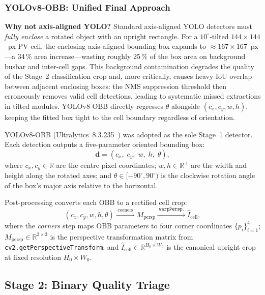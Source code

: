 \documentclass[conference]{IEEEtran}
\begin{document}
\subsubsection{YOLOv8-OBB: Unified Final Approach}
\label{sec:yolo}

\textbf{Why not axis-aligned YOLO?} Standard axis-aligned YOLO detectors must \textit{fully enclose} a rotated object with an upright rectangle. For a $10^\circ$-tilted $144\times144$~px PV cell, the enclosing axis-aligned bounding box expands to $\approx$$\!167\times167$~px---a 34\,\% area increase---wasting roughly 25\,\% of the box area on background busbar and inter-cell gaps. This background contamination degrades the quality of the Stage~2 classification crop and, more critically, causes heavy IoU overlap between adjacent enclosing boxes: the NMS suppression threshold then erroneously removes valid cell detections, leading to systematic missed extractions in tilted modules. YOLOv8-OBB directly regresses $\theta$ alongside $(c_x, c_y, w, h)$, keeping the fitted box tight to the cell boundary regardless of orientation.

YOLOv8-OBB (Ultralytics~8.3.235~\cite{jocher2023}) was adopted as the sole Stage~1 detector. Each detection outputs a five-parameter oriented bounding box:
\begin{equation}
  \mathbf{d} = (c_x,\; c_y,\; w,\; h,\; \theta),
  \label{eq:obb}
\end{equation}
where $c_x, c_y \in \mathbb{R}$ are the centre pixel coordinates; $w, h \in \mathbb{R}^{+}$ are the width and height along the rotated axes; and $\theta \in [-90^\circ, 90^\circ)$ is the clockwise rotation angle of the box's major axis relative to the horizontal.

Post-processing converts each OBB to a rectified cell crop:
\begin{equation}
  (c_x, c_y, w, h, \theta)
  \xrightarrow{\;\text{corners}\;}
  M_{\text{persp}}
  \xrightarrow{\;\texttt{warpPersp.}\;}
  \hat{I}_{\text{cell}},
  \label{eq:postproc}
\end{equation}
where the \textit{corners} step maps OBB parameters to four corner coordinates $\{p_i\}_{i=1}^{4}$; $M_{\text{persp}} \in \mathbb{R}^{3\times3}$ is the perspective transformation matrix from \texttt{cv2.getPerspectiveTransform}; and $\hat{I}_{\text{cell}} \in \mathbb{R}^{H_0 \times W_0}$ is the canonical upright crop at fixed resolution $H_0 \times W_0$.

\subsection{Stage 2: Binary Quality Triage}
\label{sec:stage2}
\end{document}
